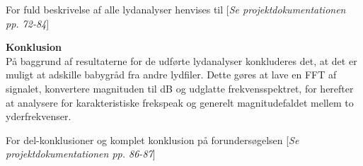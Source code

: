 
For fuld beskrivelse af alle lydanalyser henvises til [\textit{Se projektdokumentationen pp. 72-84}]

\textbf{Konklusion}\\ 
På baggrund af resultaterne for de udførte lydanalyser konkluderes det, at det er muligt at adskille babygråd fra andre lydfiler. Dette gøres at lave en FFT af signalet, konvertere magnituden til dB og udglatte frekvensspektret, for herefter at analysere for karakteristiske frekspeak og generelt magnitudefaldet mellem to yderfrekvenser. 

For del-konklusioner og komplet konklusion på forundersøgelsen [\textit{Se projektdokumentationen pp. 86-87}]